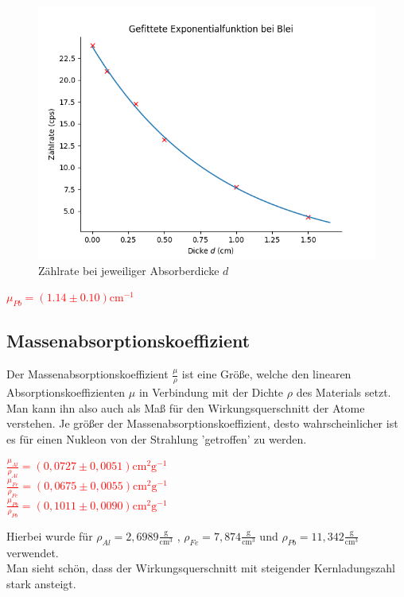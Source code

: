 \begin{figure}[ht]
    \centering
    \includegraphics[width = 12cm]{Bilder/Auswertung/AbsorbtioskPb.png}
    \caption{Zählrate bei jeweiliger Absorberdicke $d$}
    \label{AbsorbtionkoeffPb}
\end{figure}

\begin{center}
    \centering
    \textcolor{red}{$\mu_{Pb}= (1.14 \pm 0.10) \mathrm{cm}^{-1}$}
\end{center}

\subsection{Massenabsorptionskoeffizient}

Der Massenabsorptionskoeffizient $\frac{\mu}{\rho}$ ist eine Größe, welche den linearen Absorptionskoeffizienten $\mu$ in Verbindung mit der Dichte $\rho$ des Materials setzt.
Man kann ihn also auch als Maß für den Wirkungsquerschnitt der Atome verstehen. Je größer der Massenabsorptionskoeffizient, desto wahrscheinlicher ist es für einen 
Nukleon von der Strahlung 'getroffen' zu werden. 

\begin{center}
    \centering
    \textcolor{red}{$\frac{\mu_{Al}}{\rho_{Al}} = (0,0727 \pm 0,0051) \mathrm{cm}^{2} \mathrm{g}^{-1}$}\\
    \textcolor{red}{$\frac{\mu_{Fe}}{\rho_{Fe}}= (0,0675 \pm 0,0055) \mathrm{cm}^{2} \mathrm{g}^{-1}$}\\
    \textcolor{red}{$\frac{\mu_{Pb}}{\rho_{Pb}}= (0,1011 \pm 0,0090) \mathrm{cm}^{2} \mathrm{g}^{-1}$}\\
\end{center}

Hierbei wurde für $\rho_{Al} = 	2,6989 \frac{\mathrm{g}}{\mathrm{cm}^3}$ \footnotemark 
{}, $\rho_{Fe} = 	7,874 \frac{\mathrm{g}}{\mathrm{cm}^3}$ \footnotemark 
{} und
$\rho_{Pb} = 11,342 \frac{\mathrm{g}}{\mathrm{cm}^3}$ \footnotemark {} verwendet.\\
Man sieht schön, dass der Wirkungsquerschnitt mit steigender Kernladungszahl stark ansteigt.


